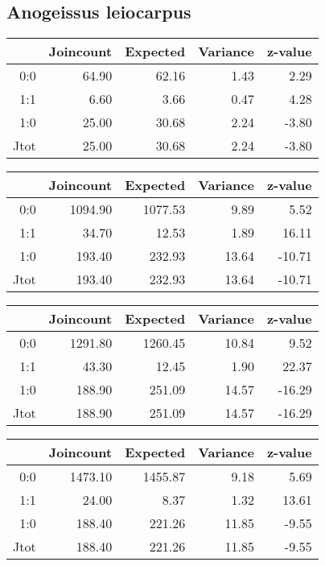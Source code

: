\documentclass[a4paper, oneside, 12pt]{book}
\begin{document}
\subsection{Anogeissus leiocarpus}
\begin{table}[H]
	\centering
	\begin{tabular}{rrrrr}
		\hline
		& Joincount & Expected & Variance & z-value \\ 
		\hline
		0:0 & 64.90 & 62.16 & 1.43 & 2.29 \\ 
		1:1 & 6.60 & 3.66 & 0.47 & 4.28 \\ 
		1:0 & 25.00 & 30.68 & 2.24 & -3.80 \\ 
		Jtot & 25.00 & 30.68 & 2.24 & -3.80 \\ 
		\hline
	\end{tabular}
\end{table}
\begin{table}[H]
	\centering
	\begin{tabular}{rrrrr}
		\hline
		& Joincount & Expected & Variance & z-value \\ 
		\hline
		0:0 & 1094.90 & 1077.53 & 9.89 & 5.52 \\ 
		1:1 & 34.70 & 12.53 & 1.89 & 16.11 \\ 
		1:0 & 193.40 & 232.93 & 13.64 & -10.71 \\ 
		Jtot & 193.40 & 232.93 & 13.64 & -10.71 \\ 
		\hline
	\end{tabular}
\end{table}

\begin{table}[H]
	\centering
	\begin{tabular}{rrrrr}
		\hline
		& Joincount & Expected & Variance & z-value \\ 
		\hline
		0:0 & 1291.80 & 1260.45 & 10.84 & 9.52 \\ 
		1:1 & 43.30 & 12.45 & 1.90 & 22.37 \\ 
		1:0 & 188.90 & 251.09 & 14.57 & -16.29 \\ 
		Jtot & 188.90 & 251.09 & 14.57 & -16.29 \\ 
		\hline
	\end{tabular}
\end{table}
\begin{table}[H]
	\centering
	\begin{tabular}{rrrrr}
		\hline
		& Joincount & Expected & Variance & z-value \\ 
		\hline
		0:0 & 1473.10 & 1455.87 & 9.18 & 5.69 \\ 
		1:1 & 24.00 & 8.37 & 1.32 & 13.61 \\ 
		1:0 & 188.40 & 221.26 & 11.85 & -9.55 \\ 
		Jtot & 188.40 & 221.26 & 11.85 & -9.55 \\ 
		\hline
	\end{tabular}
\end{table}
\end{document}
